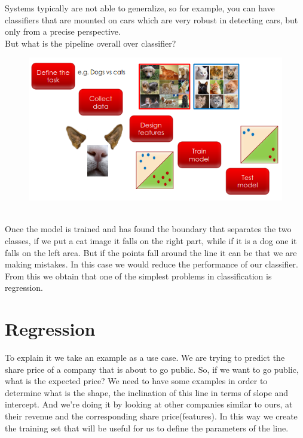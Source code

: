 Systems typically are not able to generalize, so for example, you can have classifiers that are mounted on cars which are very robust in detecting cars, but only from a precise perspective.
\\But what is the pipeline overall over classifier?
\begin{figure}[h]
    \centering
    \includegraphics[scale=0.6]{Figures/PipelineClassifier.png}
\end{figure}
\\Once the model is trained and has found the boundary that separates the two classes, if we put a cat image it falls on the right part, while if it is a dog one it falls on the left area. But if the points fall around the line it can be that we are making mistakes.
In this case we would reduce the performance of our classifier. From this we obtain that one of the simplest problems in classification is regression.
\section{Regression}
To explain it we take an example as a use case. We are trying to predict the share price of a company that is about to go public.
So, if we want to go public, what is the expected price? We need to have some examples in order to determine what is the shape, the inclination of this line in terms of slope and intercept.
And we're doing it by looking at other companies similar to ours, at their revenue and the corresponding share price(features).
In this way we create the training set that will be useful for us to define the parameters of the line.

